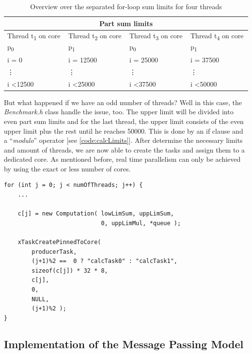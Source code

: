 \renewcommand{\arraystretch}{1.5}

\begin{table}[h!]
	\centering
	\begin{tabular}{ | m{3cm} | m{3cm} | m{3cm} | m{3cm} |  }
		\hline
		\multicolumn{4}{|c|}{Part sum limits} \\
		\hline
			Thread t\textsubscript{1} on core p\textsubscript{0} & 
			Thread t\textsubscript{2} on core p\textsubscript{1} &
			Thread t\textsubscript{3} on core p\textsubscript{0} &
			Thread t\textsubscript{4} on core p\textsubscript{1} \\
		\hline
			i = 0 & i = 12500 & i = 25000 & i = 37500 \\
			\vdots & \vdots & \vdots & \vdots \\
			i \textless 12500 & i \textless 25000 & i \textless 37500 & i \textless 50000 \\
		\hline
	\end{tabular}
	\caption{ Overview over the separated for-loop sum limits for four threads }
	\label{table:partSumLimits}
\end{table}

But what happened if we have an odd number of threads? Well in this case, the \textit{Benchmark.h} class handle the issue, too. The upper limit will be divided into even part sum limits and for the last thread, the upper limit consists of the even upper limit plus the rest until he reaches 50000. This is done by an if clause and a ``\textit{modulo}'' operator [see \ref{code:calcLimits}]. After determine the necessary limits and amount of threads, we are now able to create the tasks and assign them to a dedicated core. As mentioned before, real time parallelism can only be achieved by using the exact or less number of cores. 

\begin{lstlisting}[label={code:createThreads}]
for (int j = 0; j < numOfThreads; j++) {
	...
	
	c[j] = new Computation(	lowLimSum, uppLimSum, 
							0, uppLimMul, *queue );

	xTaskCreatePinnedToCore(
		producerTask,
		(j+1)%2 ==  0 ? "calcTask0" : "calcTask1",
		sizeof(c[j]) * 32 * 8,
		c[j],
		0,
		NULL,
		(j+1)%2 );
}
\end{lstlisting}  

\newpage

\subsection{Implementation of the Message Passing Model}

